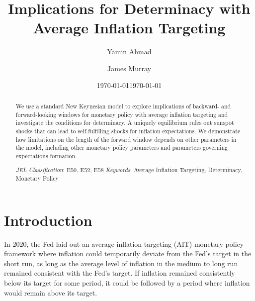 \documentclass[english,authoryear,12pt]{elsarticle}
\begin{document}
	\begin{frontmatter}
		\title{Implications for Determinacy with Average Inflation Targeting}
		\date{\today}
		\author[1]{Yamin Ahmad}
		\author[2]{James Murray}

		\address[1]{Dept. of Economics, University of Wisconsin - Whitewater, 809 W. Starin Road, Whitewater, WI 53190, USA}
		\address[2]{Dept. of Economics, University of Wisconsin - La Crosse, 1725 State St., La Crosse, WI 54601, USA}

	\date{\today}

	\begin{abstract}
		We use a standard New Keynesian model to explore implications of backward- and forward-looking windows for monetary policy with average inflation targeting and investigate the conditions for determinacy. A uniquely equilibrium rules out sunspot shocks that can lead to self-fulfilling shocks for inflation expectations. We demonstrate how limitations on the length of the forward window depends on other parameters in the model, including other monetary policy parameters and parameters governing expectations formation.

		\begin{flushleft}
			{\it JEL Classification}: E50, E52, E58 \newline
			{\it Keywords}: Average Inflation Targeting, Determinacy, Monetary Policy
		\end{flushleft}
	\end{abstract}

\end{frontmatter}

\renewcommand{\thefootnote}{\arabic{footnote}}%
\setcounter{page}{1}%
\setcounter{footnote}{0}%


\section{\label{Intro}Introduction}
In 2020, the Fed laid out an average inflation targeting (AIT) monetary policy framework where inflation could temporarily deviate from the Fed's target in the short run, as long as the average level of inflation in the medium to long run remained consistent with the Fed's target. If inflation remained consistently below its target for some period, it could be followed by a period where inflation would remain above its target.
\end{document}
